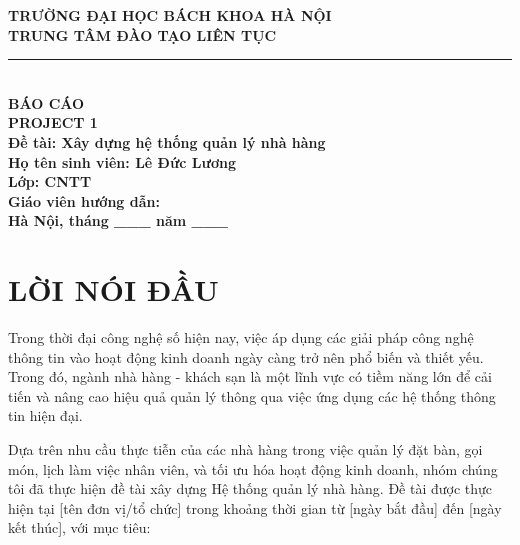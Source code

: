 \documentclass[a4paper,12pt]{article}
\begin{document}
\begin{titlepage}
  \begin{center}
    \large\textbf{TRƯỜNG ĐẠI HỌC BÁCH KHOA HÀ NỘI}\\
    \textbf{TRUNG TÂM ĐÀO TẠO LIÊN TỤC}\\
    \rule{\textwidth}{0.5pt} \\[5em] %

    \Huge\textbf{BÁO CÁO}\\[0.5em]
    \LARGE\textbf{PROJECT 1}\\[5em]

    \textbf{\large Đề tài: Xây dựng hệ thống quản lý nhà hàng}\\[4em]

    \textbf{\large Họ tên sinh viên: Lê Đức Lương}\\

    \textbf{\large Lớp: CNTT}\\

    \textbf{\large Giáo viên hướng dẫn:}\\[10em]

    \textbf{\large Hà Nội, tháng \_\_\_ năm \_\_\_}\\
  \end{center}
\end{titlepage}

\section*{\centering \LARGE LỜI NÓI ĐẦU}
Trong thời đại công nghệ số hiện nay, việc áp dụng các giải pháp công nghệ thông tin vào hoạt động kinh doanh ngày càng trở nên phổ biến và thiết yếu. Trong đó, ngành nhà hàng - khách sạn là một lĩnh vực có tiềm năng lớn để cải tiến và nâng cao hiệu quả quản lý thông qua việc ứng dụng các hệ thống thông tin hiện đại.

Dựa trên nhu cầu thực tiễn của các nhà hàng trong việc quản lý đặt bàn, gọi món, lịch làm việc nhân viên, và tối ưu hóa hoạt động kinh doanh, nhóm chúng tôi đã thực hiện đề tài xây dựng Hệ thống quản lý nhà hàng. Đề tài được thực hiện tại [tên đơn vị/tổ chức] trong khoảng thời gian từ [ngày bắt đầu] đến [ngày kết thúc], với mục tiêu:
\end{document}
